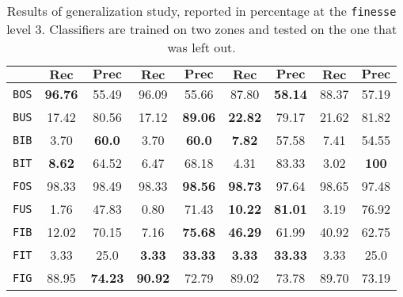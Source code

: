 \begin{table}
\begin{center}
\begin{tabular}{|c | c c | c c | c c | c c |}
                    \cline{2-9}
                    & \(\bm{Rec}\) & \(\bm{Prec}\) &  \(\bm{Rec}\) & \(\bm{Prec}\) &  \(\bm{Rec}\) & \(\bm{Prec}\) &  \(\bm{Rec}\) & \(\bm{Prec}\) \\
                    \hline
                    \texttt{BOS} & \textbf{96.76} & 55.49 & 96.09 & 55.66 & 87.80 & \textbf{58.14} & 88.37 & 57.19 \\
                    \hline
                    \texttt{BUS} & 17.42 & 80.56 & 17.12 & \textbf{89.06} & \textbf{22.82} & 79.17 & 21.62 & 81.82 \\
                    \hline
                    \texttt{BIB} & 3.70 & \textbf{60.0} & 3.70 & \textbf{60.0} & \textbf{7.82} & 57.58 & 7.41 & 54.55 \\
                    \hline
                    \texttt{BIT} & \textbf{8.62} & 64.52 & 6.47 & 68.18 & 4.31 & 83.33 & 3.02 & \textbf{100} \\
                    \hline
                    \texttt{FOS} & 98.33 & 98.49 & 98.33 & \textbf{98.56} & \textbf{98.73} & 97.64 & 98.65 & 97.48 \\
                    \hline
                    \texttt{FUS} & 1.76 & 47.83 & 0.80 & 71.43 & \textbf{10.22} & \textbf{81.01} & 3.19 & 76.92 \\
                    \hline
                    \texttt{FIB} & 12.02 & 70.15 & 7.16 & \textbf{75.68} & \textbf{46.29} & 61.99 & 40.92 & 62.75 \\
                    \hline
                    \texttt{FIT} & 3.33 & 25.0 & \textbf{3.33} & \textbf{33.33} & \textbf{3.33} & \textbf{33.33} & 3.33 & 25.0 \\
                    \hline
                    \texttt{FIG} & 88.95 & \textbf{74.23} & \textbf{90.92} & 72.79 & 89.02 & 73.78 & 89.70 & 73.19 \\
                    \hline
                \end{tabular}
                \caption{
                    \label{tab::generalization_f3}
                    Results of generalization study, reported in percentage at the \texttt{finesse} level $3$.
                Classifiers are trained on two zones and tested on the one that was left out.
                }
            \end{center}
        \end{table}

